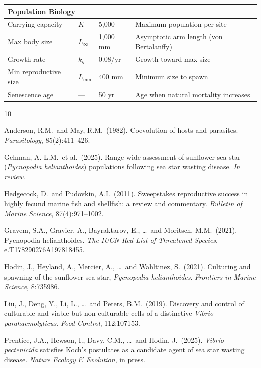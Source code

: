 \documentclass[11pt]{article}
\begin{document}
\begin{longtable}{p{3.5cm} p{1.5cm} p{1.5cm} p{6.5cm}}
\multicolumn{4}{l}{\textbf{Population Biology}} \\
\hline
Carrying capacity & $K$ & 5,000 & Maximum population per site \\
Max body size & $L_\infty$ & 1,000 mm & Asymptotic arm length (von Bertalanffy) \\
Growth rate & $k_g$ & 0.08/yr & Growth toward max size \\
Min reproductive size & $L_\text{min}$ & 400 mm & Minimum size to spawn \\
Senescence age & --- & 50 yr & Age when natural mortality increases \\
\end{longtable}
\normalsize

\begin{thebibliography}{10}

Anderson, R.M.\ and May, R.M.\ (1982).
\newblock Coevolution of hosts and parasites.
\newblock \textit{Parasitology}, 85(2):411--426.

Gehman, A.-L.M.\ et al.\ (2025).
\newblock Range-wide assessment of sunflower sea star (\textit{Pycnopodia helianthoides}) populations following sea star wasting disease.
\newblock \textit{In review}.

Hedgecock, D.\ and Pudovkin, A.I.\ (2011).
\newblock Sweepstakes reproductive success in highly fecund marine fish and shellfish: a review and commentary.
\newblock \textit{Bulletin of Marine Science}, 87(4):971--1002.

Gravem, S.A., Gravier, A., Bayraktarov, E., \ldots\ and Moritsch, M.M.\ (2021).
\newblock Pycnopodia helianthoides.
\newblock \textit{The IUCN Red List of Threatened Species}, e.T178290276A197818455.

Hodin, J., Heyland, A., Mercier, A., \ldots\ and Wahltinez, S.\ (2021).
\newblock Culturing and spawning of the sunflower sea star, \textit{Pycnopodia helianthoides}.
\newblock \textit{Frontiers in Marine Science}, 8:735986.

Liu, J., Deng, Y., Li, L., \ldots\ and Peters, B.M.\ (2019).
\newblock Discovery and control of culturable and viable but non-culturable cells of a distinctive \textit{Vibrio parahaemolyticus}.
\newblock \textit{Food Control}, 112:107153.

Prentice, J.A., Hewson, I., Davy, C.M., \ldots\ and Hodin, J.\ (2025).
\newblock \textit{Vibrio pectenicida} satisfies Koch's postulates as a candidate agent of sea star wasting disease.
\newblock \textit{Nature Ecology \& Evolution}, in press.


\end{thebibliography}
\end{document}
